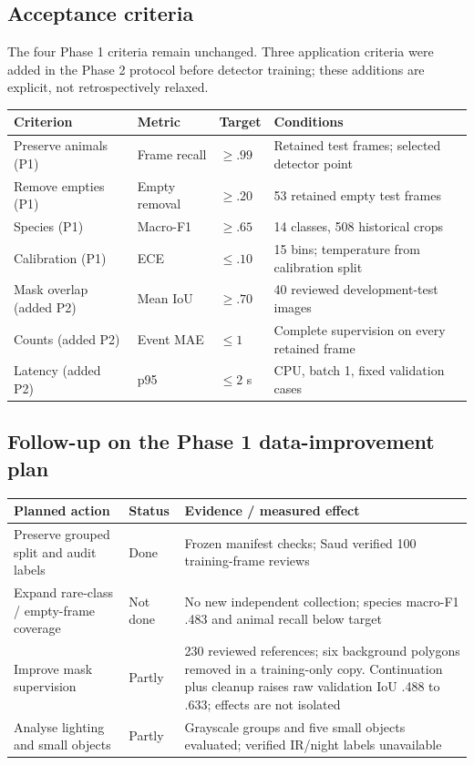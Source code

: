 \documentclass[11pt,a4paper]{article}
\begin{document}
\subsection*{Acceptance criteria}
The four Phase 1 criteria remain unchanged. Three application criteria were added in the Phase 2 protocol before detector training; these additions are explicit, not retrospectively relaxed.
\par\noindent\begin{tabularx}{\linewidth}{@{}Y l l Y@{}}\toprule
Criterion & Metric & Target & Conditions\\\midrule
Preserve animals (P1) & Frame recall & $\geq .99$ & Retained test frames; selected detector point\\
Remove empties (P1) & Empty removal & $\geq .20$ & 53 retained empty test frames\\
Species (P1) & Macro-F1 & $\geq .65$ & 14 classes, 508 historical crops\\
Calibration (P1) & ECE & $\leq .10$ & 15 bins; temperature from calibration split\\
Mask overlap (added P2) & Mean IoU & $\geq .70$ & 40 reviewed development-test images\\
Counts (added P2) & Event MAE & $\leq 1$ & Complete supervision on every retained frame\\
Latency (added P2) & p95 & $\leq 2$ s & CPU, batch 1, fixed validation cases\\\bottomrule
\end{tabularx}\par

\subsection*{Follow-up on the Phase 1 data-improvement plan}
\par\noindent\begin{tabularx}{\linewidth}{@{}Y l Y@{}}\toprule
Planned action & Status & Evidence / measured effect\\\midrule
Preserve grouped split and audit labels & Done & Frozen manifest checks; Saud verified 100 training-frame reviews\\
Expand rare-class / empty-frame coverage & Not done & No new independent collection; species macro-F1 .483 and animal recall below target\\
Improve mask supervision & Partly & 230 reviewed references; six background polygons removed in a training-only copy. Continuation plus cleanup raises raw validation IoU .488 to .633; effects are not isolated\\
Analyse lighting and small objects & Partly & Grayscale groups and five small objects evaluated; verified IR/night labels unavailable\\\bottomrule
\end{tabularx}\par
\end{document}
